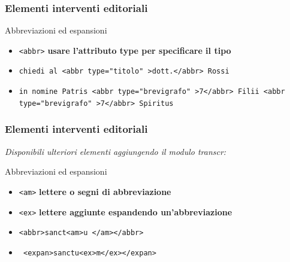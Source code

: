  \begin{frame}
    \frametitle{Elementi interventi editoriali}
    \addtocounter{nframe}{1}
    

    \begin{block}{Abbreviazioni ed espansioni}
        \begin{itemize}
            \item \texttt{<abbr>} \textbf{usare l’attributo type per specificare il tipo}
            \item[] \texttt{chiedi al <abbr type="titolo" >dott.</abbr> Rossi}
            \item[] \texttt{in nomine Patris <abbr type="brevigrafo" >7</abbr> Filii <abbr type="brevigrafo" >7</abbr> Spiritus}
        \end{itemize}
        
    \end{block}
    
\end{frame}

\begin{frame}
    \frametitle{Elementi interventi editoriali}
    \addtocounter{nframe}{1}
    
    \textit{Disponibili ulteriori elementi aggiungendo il modulo transcr:}
    \begin{block}{Abbreviazioni ed espansioni}
        \begin{itemize}
            \item \texttt{<am>} \textbf{lettere o segni di abbreviazione}
            \item \texttt{<ex>} \textbf{lettere aggiunte espandendo un’abbreviazione}
            \item[] \texttt{<abbr>sanct<am>u~</am></abbr>}
            \item[] \texttt{ <expan>sanctu<ex>m</ex></expan>}
        \end{itemize}
        
    \end{block}
    
\end{frame}
 

